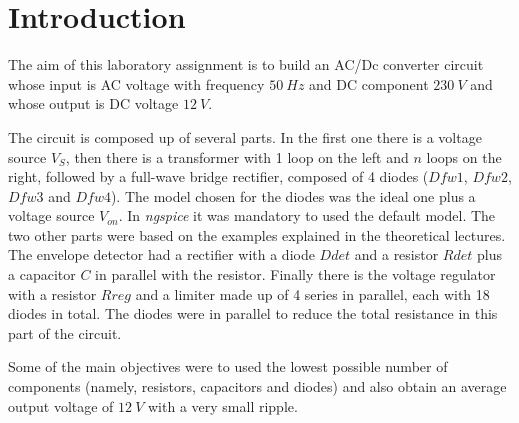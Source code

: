 \section{Introduction}
\label{sec:introduction}


The aim of this laboratory assignment is to build an AC/Dc converter circuit whose input is AC voltage with frequency $50 \ Hz$ and DC component $230 \ V$ and whose output is DC voltage $12 \ V$.


The circuit is composed up of several parts. In the first one there is a voltage source $V_S$, then there is a transformer with 1 loop on the left and $n$ loops on the right, followed by a full-wave bridge rectifier, composed of 4 diodes ($Dfw1$, $Dfw2$, $Dfw3$ and $Dfw4$). The model chosen for the diodes was the ideal one plus a voltage source $V_{on}$. In \textit{ngspice} it was mandatory to used the default model. The two other parts were based on the examples explained in the theoretical lectures. The envelope detector had a rectifier with a diode $Ddet$ and a resistor $Rdet$ plus a capacitor $C$ in parallel with the resistor. Finally there is the voltage regulator with a resistor $Rreg$ and a limiter made up of 4 series in parallel, each with 18 diodes in total. The diodes were in parallel to reduce the total resistance in this part of the circuit.


Some of the main objectives were to used the lowest possible number of components (namely, resistors, capacitors and diodes) and also obtain an average output voltage of $12 \ V$ with a very small ripple.
